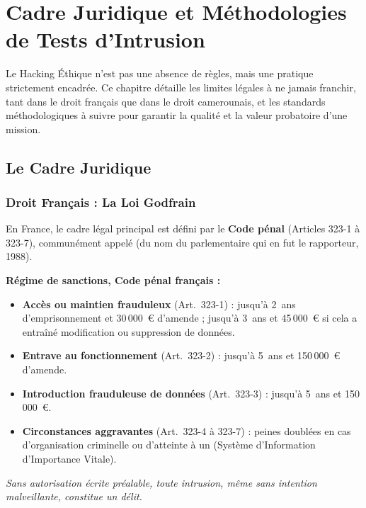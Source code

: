
\chapter{Cadre Juridique et Méthodologies de Tests d'Intrusion}
\label{chap:02_cadre_juridique}

Le Hacking Éthique n'est pas une absence de règles, mais une pratique strictement
encadrée. Ce chapitre détaille les limites légales à ne jamais franchir, tant dans
le droit français que dans le droit camerounais, et les standards méthodologiques
à suivre pour garantir la qualité et la valeur probatoire d'une mission.

\section{Le Cadre Juridique}
\label{sec:cadre_juridique}

\subsection{Droit Français : La Loi Godfrain}
\label{subsec:loi_godfrain}

En France, le cadre légal principal est défini par le \textbf{Code pénal}
(Articles 323-1 à 323-7), communément appelé  (du nom
du parlementaire qui en fut le rapporteur, 1988).

\begin{boxalert}
\textbf{Régime de sanctions, Code pénal français :}
\begin{itemize}
    \item \textbf{Accès ou maintien frauduleux} (Art.~323-1) : jusqu'à
          2~ans d'emprisonnement et 30\,000~€ d'amende ;
          jusqu'à 3~ans et 45\,000~€ si cela a entraîné modification
          ou suppression de données.
    \item \textbf{Entrave au fonctionnement} (Art.~323-2) : jusqu'à
          5~ans et 150\,000~€ d'amende.
    \item \textbf{Introduction frauduleuse de données} (Art.~323-3) :
          jusqu'à 5~ans et 150\,000~€.
    \item \textbf{Circonstances aggravantes} (Art.~323-4 à 323-7) :
          peines doublées en cas d'organisation criminelle ou d'atteinte
          à un  (Système d'Information d'Importance Vitale).
\end{itemize}
\textit{Sans autorisation écrite préalable, toute intrusion, même
sans intention malveillante, constitue un délit.}
\end{boxalert}


